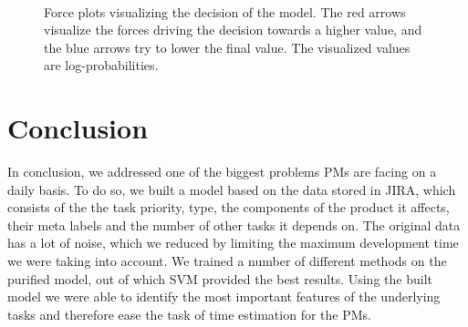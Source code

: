 \documentclass[conference,compsoc]{IEEEtran}
\begin{document}
\begin{figure}[!t]
	\centering
	 \\
	\label{force-plots}
	\caption{Force plots visualizing the decision of the model. The red arrows visualize the forces driving the decision towards a higher value, and the blue arrows try to lower the final value. The visualized values are log-probabilities.}
\end{figure}

\section{Conclusion}
In conclusion, we addressed one of the biggest problems PMs are facing on a daily basis. To do so, we built a model based on the data stored in JIRA, which consists of the the task priority, type, the components of the product it affects, their meta labels and the number of other tasks it depends on. The original data has a lot of noise, which we reduced by limiting the maximum development time we were taking into account. We trained a number of different methods on the purified model, out of which SVM provided the best results. Using the built model we were able to identify the most important features of the underlying tasks and therefore ease the task of time estimation for the PMs.




\end{document}
